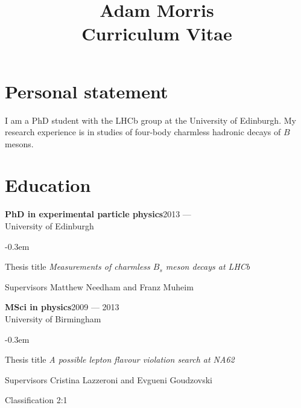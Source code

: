 \documentclass[contbibnum]{simplecv}
\title{Adam Morris\\{\large Curriculum Vitae}}
\newcommand\dateditem[2]{#1\hfill#2\\}
\newcommand\topictitle[3]{\dateditem{{\textbf{#1}}}{#3}#2}
\def\typeface{phv}
\begin{document}
	\maketitle\vspace{-3em}
	\fontfamily{\typeface}\selectfont
	\section{Personal statement}
	I am a PhD student with the LHCb group at the University of Edinburgh.
	My research experience is in studies of four-body charmless hadronic decays of $B$ mesons.
	
	
	\section{Education}
	\topictitle{PhD in experimental particle physics}{University of Edinburgh}{2013 ---}
	\begin{topic}
		\itemsep-0.3em
		\item[Thesis title]{\textit{Measurements of charmless $B_s$ meson decays at LHCb}}
		\item[Supervisors]{Matthew Needham and Franz Muheim}
	\end{topic}
	\topictitle{MSci in physics}{University of Birmingham}{2009 --- 2013}
	\begin{topic}
		\itemsep-0.3em
		\item[Thesis title]{\textit{A possible lepton flavour violation search at NA62}}
		\item[Supervisors]{Cristina Lazzeroni and Evgueni Goudzovski}
		\item[Classification]{2:1}
	\end{topic}
\end{document}
